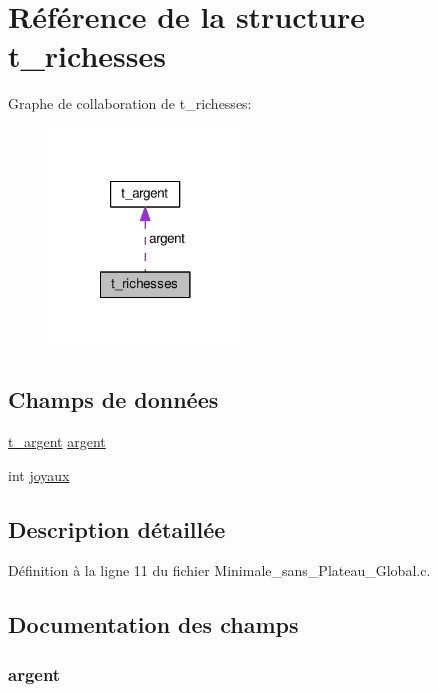\hypertarget{structt__richesses}{\section{Référence de la structure t\-\_\-richesses}
\label{structt__richesses}
}


Graphe de collaboration de t\-\_\-richesses\-:
\nopagebreak
\begin{figure}[H]
\begin{center}
\leavevmode
\includegraphics[width=146pt]{structt__richesses__coll__graph}
\end{center}
\end{figure}
\subsection*{Champs de données}
\begin{DoxyCompactItemize}
\item 
\hyperlink{structt__argent}{t\-\_\-argent} \hyperlink{structt__richesses_a42c6b53e55205ecde9f2cc1c9ce90d85}{argent}
\item 
int \hyperlink{structt__richesses_a2b6ab4591114fab25daaf1d15385ba2b}{joyaux}
\end{DoxyCompactItemize}


\subsection{Description détaillée}


Définition à la ligne 11 du fichier Minimale\-\_\-sans\-\_\-\-Plateau\-\_\-\-Global.\-c.



\subsection{Documentation des champs}
\hypertarget{structt__richesses_a42c6b53e55205ecde9f2cc1c9ce90d85}{
\subsubsection[{argent}]{ argent}}\label{structt__richesses_a42c6b53e55205ecde9f2cc1c9ce90d85}


